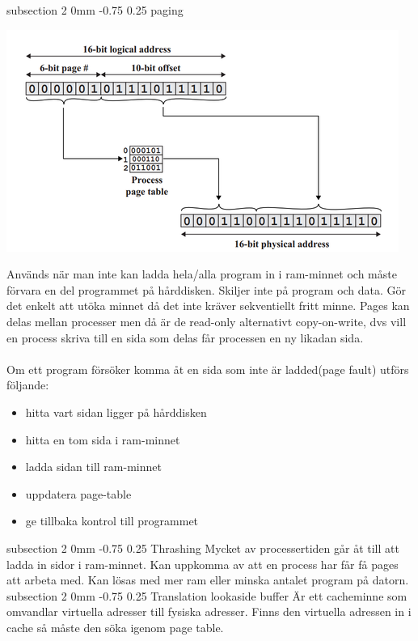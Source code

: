 \documentclass[a4paper,11pt]{article}
\makeatletter
\renewcommand{\subsection}{\@startsection
   {subsection}%
   {2}%
   {0mm}%
   {-0.75\baselineskip}%
   {0.25\baselineskip}%
   {\rmfamily\normalfont\slshape\normalsize}}%
\makeatother
\begin{document}
\subsection{paging}
\centerline{\includegraphics[scale=0.7]{paging}}
Används när man inte kan ladda hela/alla program in i ram-minnet och måste förvara en del programmet på hårddisken. Skiljer inte på program och data. Gör det enkelt att utöka minnet då det inte kräver sekventiellt fritt minne. Pages kan delas mellan processer men då är de read-only alternativt copy-on-write, dvs vill en process skriva till en sida som delas får processen en ny likadan sida.\\ \\
Om ett program försöker komma åt en sida som inte är ladded(page fault) utförs följande:
\begin{itemize}
\item hitta vart sidan ligger på hårddisken
\item hitta en tom sida i ram-minnet
\item ladda sidan till ram-minnet
\item uppdatera page-table 
\item ge tillbaka kontrol till programmet
\end{itemize}
\subsection{Thrashing}
Mycket av processertiden går åt till att ladda in sidor i ram-minnet. Kan uppkomma av att en process har får få pages att arbeta med. Kan lösas med mer ram eller minska antalet program på datorn. 
\subsection{Translation lookaside buffer}
Är ett cacheminne som omvandlar virtuella adresser till fysiska adresser. Finns den virtuella adressen in i cache så måste den söka igenom page table.
\end{document}
